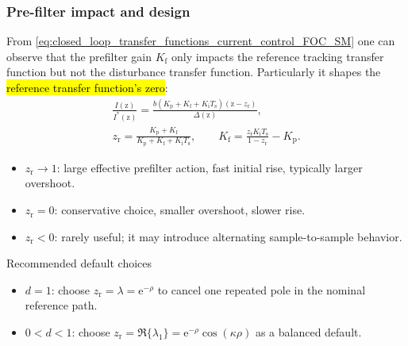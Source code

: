 \begin{frame}
    \frametitle{Pre-filter impact and design}
    From \eqref{eq:closed_loop_transfer_functions_current_control_FOC_SM} one can observe that the prefilter gain $K_\mathrm{f}$ only impacts the reference tracking transfer function but not the disturbance transfer function. Particularly it shapes the \hl{reference transfer function's zero}:
    \begin{gather}
        \frac{I(\mathrm{z})}{I^{*}(\mathrm{z})}=\frac{b(K_\mathrm{p}+K_\mathrm{f}+K_\mathrm{i}T_\mathrm{s})(\mathrm{z}-z_\mathrm{r})}{\Delta(\mathrm{z})},\\
        z_\mathrm{r}=\frac{K_\mathrm{p}+K_\mathrm{f}}{K_\mathrm{p}+K_\mathrm{f}+K_\mathrm{i}T_\mathrm{s}},
        \qquad
        K_\mathrm{f}=\frac{z_\mathrm{r}K_\mathrm{i}T_\mathrm{s}}{1-z_\mathrm{r}}-K_\mathrm{p}.
    \end{gather}\pause%
    \vspace{-0.15cm}
    \begin{itemize}
        \item $z_\mathrm{r}\rightarrow 1$: large effective prefilter action, fast initial rise, typically larger overshoot.\pause%
        \item $z_\mathrm{r}=0$: conservative choice, smaller overshoot, slower rise.\pause%
        \item $z_\mathrm{r}<0$: rarely useful; it may introduce alternating sample-to-sample behavior.\pause%
    \end{itemize}
    \vspace{-0.3cm}
    \begin{varblock}{Recommended default choices}
        \small
        \begin{itemize}
            \item $d=1$: choose $z_\mathrm{r}=\lambda=\mathrm{e}^{-\rho}$ to cancel one repeated pole in the nominal reference path.\pause%
            \item $0<d<1$: choose $z_\mathrm{r}=\Re\{\lambda_1\}=\mathrm{e}^{-\rho}\cos(\kappa\rho)$ as a balanced default.
        \end{itemize}
    \end{varblock}
\end{frame}

